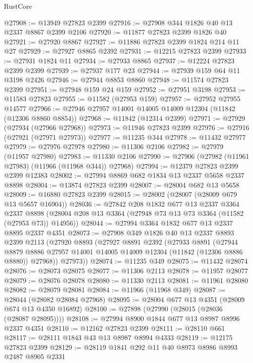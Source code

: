 \begin{lexlean}{RustCore}
\begin{coremodule}
@27908 := @13949 @27823 @2399
@27916 := @27908 @344 @1826 @40 @13 @2337 @8867 @2399 @2106
@27920 := @11877 @27823 @2399 @1826 @40
@27921 := @27920 @8867
@27927 := @11886 @27823 @2399 @1824 @214 @11 @27
@27929 := @27927 @8865 @2392
@27931 := @12215 @27823 @2399
@27933 := @27931 @1824 @11
@27934 := @27933 @8865
@27937 := @12224 @27823 @2399 @2399
@27939 := @27937 @177 @23
@27944 := @27939 @159 @64 @11 @3198 @2426
@27946 := @27944 @8853 @8860
@27948 := @11574 @27823 @2399
@27951 := @27948 @159 @24 @159
@27952 := @27951 @3198
@27953 := @11583 @27823
@27955 := @11582 (@27953 @159)
@27957 := @27952 @27955 @14577
@27966 := @27946 @27957 @14001 @14005 @14009 @12304 (@11842 (@12306 @8860 @8854))
@27968 := @11842 (@12314 @2399)
@27971 := @27929 (@27934 (@27966 @27968))
@27973 := @11946 @27823 @2399
@27976 := @27916 (@27921 (@27971 @27973))
@27977 := @11235 @344
@27978 := @11432 @27977
@27979 := @27976 @27978
@27980 := @11306 @2106
@27982 := @27979 (@11957 @27980)
@27983 := @11330 @2106
@27990 := @27906 (@27982 (@11961 @27983) (@11966 (@11968 @344)) @27968)
@27994 := @12379 @27823 @2399 @2399 @12383
@28002 := @27994 @8869 @682 @1834 @13 @2337 @5658 @2337 @8898
@28004 := @13874 @27823 @2399
@28007 := @28004 @682 @13 @5658
@28009 := @16880 @27823 @2399
@28015 := @28002 (@28007 (@28009 @679 @13 @5657 @16904))
@28036 := @27842
    @208
    @1832
    @677
    @13
    @2337
    @3364
    @2337
    @8898
    (@28004 @208 @13 @3364 (@27948 @73 @13 @73 @3364 (@11582 (@27953 @73)) @14956))
@28044 := @27994 @3364 @1832 @677 @13 @2337 @8895 @2337 @4351
@28073 := @27908
    @349
    @1826
    @40
    @13
    @2337
    @8893
    @2399
    @2113
    (@27920
      @8893
      (@27927
        @8891
        @2392
        (@27933
          @8891
          (@27944
            @8879
            @8886
            @27957
            @14001
            @14005
            @14009
            @12304
            (@11842 (@12306 @8886 @8880))
            @27968))
        @27973))
@28074 := @11235 @349
@28075 := @11432 @28074
@28076 := @28073 @28075
@28077 := @11306 @2113
@28078 := @11957 @28077
@28079 := @28076 @28078
@28080 := @11330 @2113
@28081 := @11961 @28080
@28082 := @28079 @28081
@28084 := @11966 (@11968 @349)
@28087 := @28044 (@28082 @28084 @27968)
@28095 := @28004 @677 @13 @4351 (@28009 @674 @13 @4350 @16892)
@28100 := @27898 (@27990 (@28015 (@28036 (@28087 @28095))))
@28108 := @27994 @8900 @1844 @677 @13 @8987 @8996 @2337 @4351
@28110 := @12162 @27823 @2399
@28111 := @28110 @661
@28117 := @28111 @1843 @43 @13 @8987 @8994 @4333
@28119 := @12175 @27823 @2399
@28129 := @28119 @1841 @292 @11 @40 @8973 @8986 @8993 @2487 @8905 @2331

\end{coremodule}
\end{lexlean}
